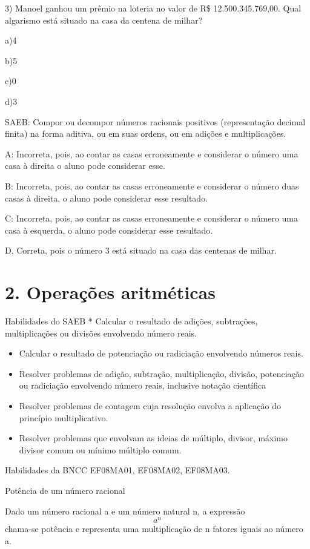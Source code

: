 3) Manoel ganhou um prêmio na loteria no valor de R\$ 12.500.345.769,00.
Qual algarismo está situado na casa da centena de milhar?

a)4

b)5

c)0

d)3

SAEB: Compor ou decompor números racionais positivos (representação
decimal finita) na forma aditiva, ou em suas ordens, ou em adições e
multiplicações.

A: Incorreta, pois, ao contar as casas erroneamente e considerar o
número uma casa à direita o aluno pode considerar esse.

B: Incorreta, pois, ao contar as casas erroneamente e considerar o
número duas casas à direita, o aluno pode considerar esse resultado.

C: Incorreta, pois, ao contar as casas erroneamente e considerar o
número uma casa à esquerda, o aluno pode considerar esse resultado.

D, Correta, pois o número 3 está situado na casa das centenas de milhar.


\section{2. Operações
aritméticas}

Habilidades do SAEB * Calcular o resultado de adições, subtrações,
multiplicações ou divisões envolvendo número reais.

\begin{itemize}
\item
  Calcular o resultado de potenciação ou radiciação envolvendo números
  reais.
\item
  Resolver problemas de adição, subtração, multiplicação, divisão,
  potenciação ou radiciação envolvendo número reais, inclusive notação
  científica
\item
  Resolver problemas de contagem cuja resolução envolva a aplicação do
  princípio multiplicativo.
\item
  Resolver problemas que envolvam as ideias de múltiplo, divisor, máximo
  divisor comum ou mínimo múltiplo comum.
\end{itemize}

Habilidades da BNCC EF08MA01, EF08MA02, EF08MA03.

Potência de um número racional

Dado um número racional a e um número natural n, a expressão \[ a^n \]
chama-se potência e representa uma multiplicação de n fatores iguais ao
número a.

